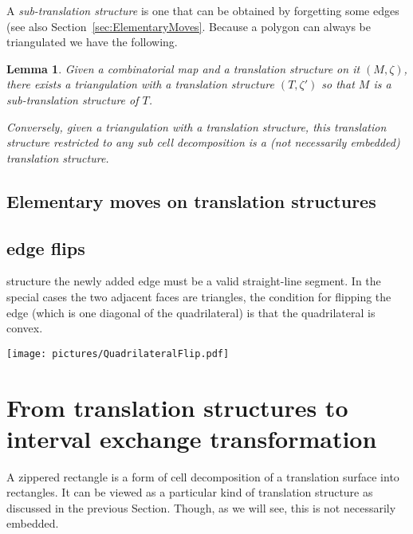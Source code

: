 \documentclass{article}
\newtheorem{lemma}[definition]{Lemma}
\begin{document}
A \emph{sub-translation structure} is one that can be obtained by forgetting
some edges (see also Section~\ref{sec:ElementaryMoves}. Because a polygon can always be triangulated we have the following.
\begin{lemma}
Given a combinatorial map and a translation structure on it $(M,\zeta)$, there
exists a triangulation with a translation structure $(T,\zeta')$ so that $M$ is
a sub-translation structure of $T$.

Conversely, given a triangulation with a translation structure, this translation
structure restricted to any sub cell decomposition is a (not necessarily embedded)
translation structure.
\end{lemma}


\subsection{Elementary moves on translation structures}
\subsection{edge flips}
structure the newly added edge must be a valid straight-line segment.
In the special cases the two adjacent faces are triangles, the condition
for flipping the edge (which is one diagonal of the quadrilateral) is that the
quadrilateral is convex.
\begin{center}\texttt{[image: pictures/QuadrilateralFlip.pdf]}\end{center}


\section{From translation structures to interval exchange transformation}
A zippered rectangle is a form of cell decomposition of a translation
surface into rectangles. It can be viewed as a particular kind of translation
structure as discussed in the previous Section. Though, as we will see, this
is not necessarily embedded.
\end{document}
